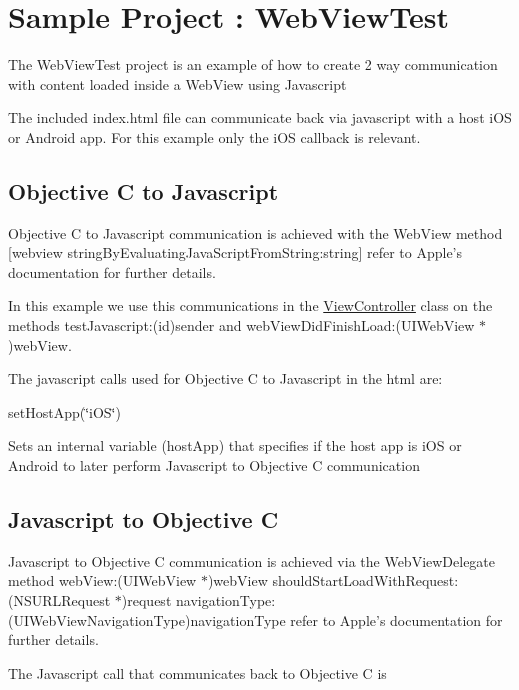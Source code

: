 \hypertarget{index_intro_sec}{}\section{Sample Project \-: Web\-View\-Test}\label{index_intro_sec}
The Web\-View\-Test project is an example of how to create 2 way communication with content loaded inside a Web\-View using Javascript

The included index.\-html file can communicate back via javascript with a host i\-O\-S or Android app. For this example only the i\-O\-S callback is relevant.\hypertarget{index_objc_to_java}{}\subsection{Objective C to Javascript}\label{index_objc_to_java}
Objective C to Javascript communication is achieved with the Web\-View method \mbox{[}webview string\-By\-Evaluating\-Java\-Script\-From\-String\-:string\mbox{]} refer to Apple's documentation for further details.

In this example we use this communications in the \hyperlink{interface_view_controller}{View\-Controller} class on the methods test\-Javascript\-:(id)sender and web\-View\-Did\-Finish\-Load\-:(\-U\-I\-Web\-View $\ast$)web\-View.

The javascript calls used for Objective C to Javascript in the html are\-:


\begin{DoxyItemize}
\item set\-Host\-App(\char`\"{}i\-O\-S\char`\"{})
\end{DoxyItemize}

Sets an internal variable (host\-App) that specifies if the host app is i\-O\-S or Android to later perform Javascript to Objective C communication\hypertarget{index_java_to_objc}{}\subsection{Javascript to Objective C}\label{index_java_to_objc}
Javascript to Objective C communication is achieved via the Web\-View\-Delegate method web\-View\-:(\-U\-I\-Web\-View $\ast$)web\-View should\-Start\-Load\-With\-Request\-:(\-N\-S\-U\-R\-L\-Request $\ast$)request navigation\-Type\-:(\-U\-I\-Web\-View\-Navigation\-Type)navigation\-Type refer to Apple's documentation for further details.

The Javascript call that communicates back to Objective C is


